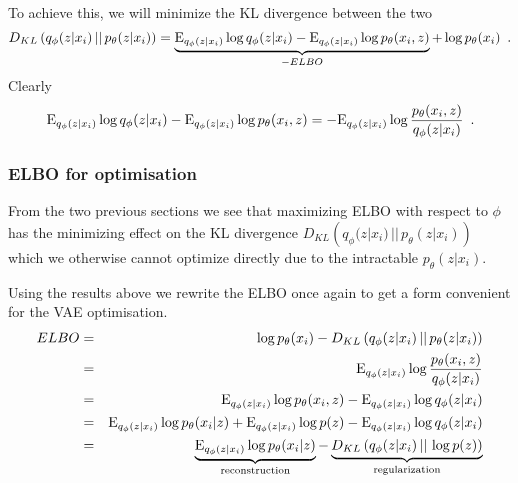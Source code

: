 To achieve this, we will minimize the KL divergence between the two
\begin{equation}
  D_{KL} \left( q_{\phi}(z|x_i) \, || \, p_{\theta}(z | x_i) \right) =  
  \underbrace{\mathrm{E}_{q_{\phi}(z|x_i)} \log q_{\phi}(z|x_i) - \mathrm{E}_{q_{\phi}(z|x_i)} \log p_{\theta}(x_i, z)}_{-ELBO} + \log p_{\theta}(x_i)
  \enspace .
\end{equation}
Clearly
\begin{equation}
  \mathrm{E}_{q_{\phi}(z|x_i)} \log q_{\phi}(z|x_i) - \mathrm{E}_{q_{\phi}(z|x_i)} \log p_{\theta}(x_i, z) =
  - \mathrm{E}_{q_{\phi}(z|x_i)} \log \frac{p_{\theta}(x_i, z)}{q_{\phi}(z|x_i)}
  \enspace .
\end{equation}


\subsubsection{ELBO for optimisation}\label{sec:Vae_elboOptim}
From the two previous sections we see that maximizing ELBO with
respect to $\phi$ has the minimizing effect on the KL divergence
$D_{KL} \left( q_{\phi}(z|x_i) \, || \, p_{\theta}(z | x_i) \right)$
which we otherwise cannot optimize directly due to the intractable
$p_{\theta}(z | x_i)$.

Using the results above we rewrite the ELBO once again to get a form
convenient for the VAE optimisation.
\begin{eqnarray}\label{eq:vae_ELBOOptim}
  ELBO & = & \log p_{\theta}(x_i) - D_{KL} \left( q_{\phi}(z|x_i) \, || \, p_{\theta}(z | x_i) \right) \nonumber \\
  & = & \mathrm{E}_{q_{\phi}(z|x_i)} \log \frac{p_{\theta}(x_i, z)}{q_{\phi}(z|x_i)} \nonumber \\
  & = & \mathrm{E}_{q_{\phi}(z|x_i)} \log p_{\theta}(x_i, z) - \mathrm{E}_{q_{\phi}(z|x_i)} \log q_{\phi}(z|x_i) \nonumber \\
  & = & \mathrm{E}_{q_{\phi}(z|x_i)} \log p_{\theta}(x_i | z) + \mathrm{E}_{q_{\phi}(z|x_i)} \log p(z) - \mathrm{E}_{q_{\phi}(z|x_i)} \log q_{\phi}(z|x_i) \nonumber \\
  & = & \underbrace{\mathrm{E}_{q_{\phi}(z|x_i)} \log p_{\theta}(x_i | z)}_{\text{reconstruction}} - \underbrace{D_{KL}\left( q_{\phi}(z|x_i) \, || \, \log p(z)\right)}_{\text{regularization}}
\end{eqnarray}

